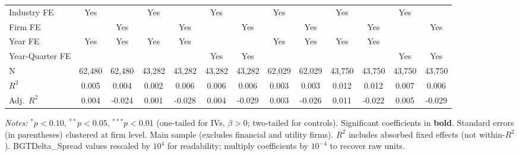 \documentclass[11pt,a4paper]{article}
\begin{document}
\begin{table}[htbp]
\begin{tabular}{lcccccccccccc}
Industry FE & Yes &  & Yes &  & Yes &  & Yes &  & Yes &  & Yes &  \\
Firm FE &  & Yes &  & Yes &  & Yes &  & Yes &  & Yes &  & Yes \\
Year FE & Yes & Yes & Yes & Yes &  &  & Yes & Yes & Yes & Yes &  &  \\
Year-Quarter FE &  &  &  &  & Yes & Yes &  &  &  &  & Yes & Yes \\
\midrule
N & 62,480 & 62,480 & 43,282 & 43,282 & 43,282 & 43,282 & 62,029 & 62,029 & 43,750 & 43,750 & 43,750 & 43,750 \\
$R^2$ & 0.005 & 0.004 & 0.002 & 0.006 & 0.006 & 0.006 & 0.003 & 0.003 & 0.012 & 0.012 & 0.007 & 0.006 \\
Adj.~$R^2$ & 0.004 & -0.024 & 0.001 & -0.028 & 0.004 & -0.029 & 0.003 & -0.026 & 0.011 & -0.022 & 0.005 & -0.029 \\
\bottomrule
\end{tabular}
\begin{minipage}{\linewidth}
\vspace{2pt}\scriptsize
\textit{Notes:} $^{*}p<0.10$, $^{**}p<0.05$, $^{***}p<0.01$ (one-tailed for IVs, $\beta > 0$; two-tailed for controls).
 Significant coefficients in \textbf{bold}.
 Standard errors (in parentheses) clustered at firm level.
 Main sample (excludes financial and utility firms).
 $R^2$ includes absorbed fixed effects (not within-$R^2$).
 BGTDelta\_Spread values rescaled by $10^4$ for readability; multiply coefficients by $10^{-4}$ to recover raw units.
\end{minipage}
\end{table}
\clearpage
\end{document}
